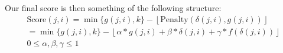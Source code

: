 
Our final score is then something of the following structure:
\begin{equation}
\begin{gathered}
\text{Score}(j,i) = \min\{g(j,i), k\} - \left\lfloor\text{Penalty}(\delta(j,i), g(j,i))\right\rfloor \\
= \min\{g(j,i), k\} - \left\lfloor \alpha * g(j,i) + \beta * \delta(j,i) + \gamma * f(\delta(j,i)) \right\rfloor \\
0 \leq \alpha, \beta, \gamma \leq 1
\end{gathered}
\end{equation}

